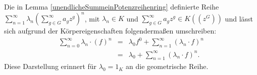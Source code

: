 %
%
%
%
%
%
%
%
%
%
%
%
%
%
%
%
%
%
%
%
%
%
%
%
\begin{bem}
Die in Lemma \ref{unendlicheSummeinPotenzreihenring} definierte Reihe $\sum_{n=1}^{\infty}\lambda_n{\left(\sum_{g \in G}^{\infty}a_g z^g\right)}^n$, mit $\lambda_n \in K$ und $\sum_{g \in G}^{\infty}a_g z^g \in K\left(\left(z^{G}\right)\right)$ und  lässt sich aufgrund der Körpereigenschaften folgendermaßen umschreiben:
\begin{eqnarray*}
\sum_{n=0}^{\infty}\lambda_n\cdot \left(f\right)^n &=& \lambda_0 f^0 + \sum_{n=1}^{\infty}\left(\lambda_n\cdot f\right)^n \\
&=& \lambda_0 + \sum_{n=1}^{\infty}\left(\lambda_n\cdot f\right)^n.
\end{eqnarray*}
%
%
%
Diese Darstellung erinnert für $\lambda_0 = 1_K$ an die geometrische Reihe. 
%
%
%
\end{bem}
%
%
%
%
%
%
%
 
